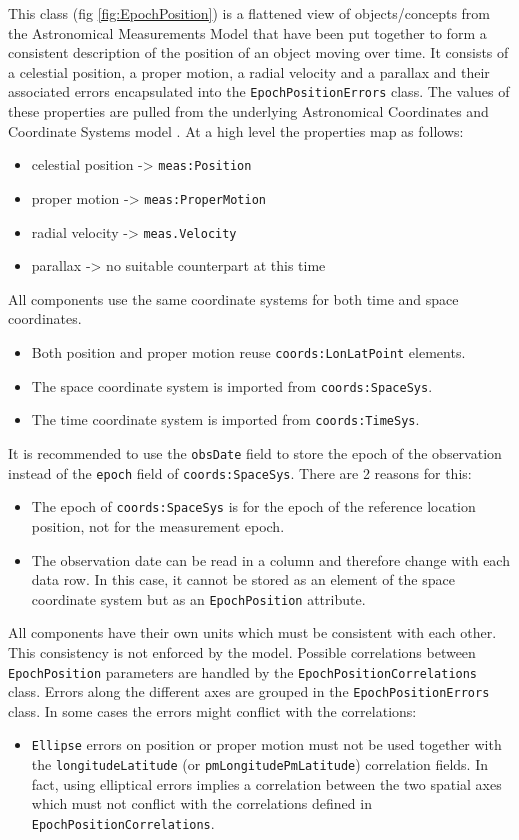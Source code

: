     
  \label{sect:EpochPosition}
    This class (fig \ref{fig:EpochPosition}) is a flattened view of objects/concepts from the Astronomical Measurements Model \citep{2022ivoa.specQ1004R} that have been put together to form a consistent description of the position of an object moving over time. It consists of a celestial position, a proper motion, a radial velocity and a parallax and their associated errors encapsulated into the \texttt{EpochPositionErrors} class. The values of these properties are pulled from the underlying Astronomical Coordinates and Coordinate Systems model \citep{2022ivoa.spec.1004R}. At a high level the properties map as follows: \begin{itemize} \item celestial position -> \texttt{meas:Position} \item proper motion -> \texttt{meas:ProperMotion} \item radial velocity -> \texttt{meas.Velocity} \item parallax -> no suitable counterpart at this time \end{itemize} All components use the same coordinate systems for both time and space coordinates. \begin{itemize} \item Both position and proper motion reuse \texttt{coords:LonLatPoint} elements. \item The space coordinate system is imported from \texttt{coords:SpaceSys}. \item The time coordinate system is imported from \texttt{coords:TimeSys}. \end{itemize} It is recommended to use the \texttt{obsDate} field to store the epoch of the observation instead of the \texttt{epoch} field of \texttt{coords:SpaceSys}. There are 2 reasons for this: \begin{itemize} \item The epoch of \texttt{coords:SpaceSys} is for the epoch of the reference location position, not for the measurement epoch. \item The observation date can be read in a column and therefore change with each data row. In this case, it cannot be stored as an element of the space coordinate system but as an \texttt{EpochPosition} attribute. \end{itemize} All components have their own units which must be consistent with each other. This consistency is not enforced by the model. Possible correlations between \texttt{EpochPosition} parameters are handled by the \texttt{EpochPositionCorrelations} class. Errors along the different axes are grouped in the \texttt{EpochPositionErrors} class. In some cases the errors might conflict with the correlations: \begin{itemize} \item \texttt{Ellipse} errors on position or proper motion must not be used together with the \texttt{longitudeLatitude} (or \texttt{pmLongitudePmLatitude}) correlation fields. In fact, using elliptical errors implies a correlation between the two spatial axes which must not conflict with the correlations defined in \texttt{EpochPositionCorrelations}. \end{itemize}

